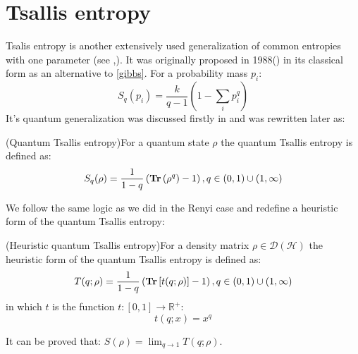 \section{Tsallis entropy}
Tsalis entropy is another extensively used generalization  of common entropies with one parameter (see \cite{tsallis1998},\cite{tsallis2016}). It was originally 
proposed in 1988(\cite{tsallis1988original}) in its classical form as an alternative to \eqref{gibbs}. For a probability mass ${p_i}$:
\begin{equation}
S_{q}\left(p_{i}\right)=\frac{k}{q-1}\left(1-\sum_{i} p_{i}^{q}\right)
\end{equation}
It's quantum generalization was discussed firstly in \cite{tsallisquantum} and was rewritten later as:
\begin{definition}(Quantum Tsallis entropy)For a quantum state $\rho$ the quantum Tsallis entropy is defined as:
\begin{equation}
S_q(\rho)=\frac{1}{1-q}\left(\operatorname{\textup{\textbf{Tr}}} \left(\rho^{q}\right)-1\right), q \in(0,1) \cup(1, \infty)
\end{equation}
\label{TsallisDEF}
\end{definition}
\noindent
We follow the same logic as we did in the Renyi case and redefine a heuristic form of the quantum Tsallis entropy:
\begin{definition}(Heuristic quantum Tsallis entropy)For a density matrix $\rho \in \mathcal{D}(\mathcal{H})$ the heuristic form of the quantum Tsallis entropy is defined as:
\begin{equation}
T(q ; \rho)= \frac{1}{1-q}\left(\operatorname{\textup{\textbf{Tr}}} \left[t(q;\rho)\right]-1\right), q \in(0,1) \cup(1, \infty)
\end{equation}
in which $t$ is the function $t:[0,1] \rightarrow \mathbb{R^{+}}$:
\begin{equation}
t(q;x)=x^{q}
\end{equation}
\label{tsallis}
\end{definition}
\begin{note}
It can be proved that: $S(\rho)=\lim _{q \rightarrow 1} T(q;\rho)$.
\end{note}